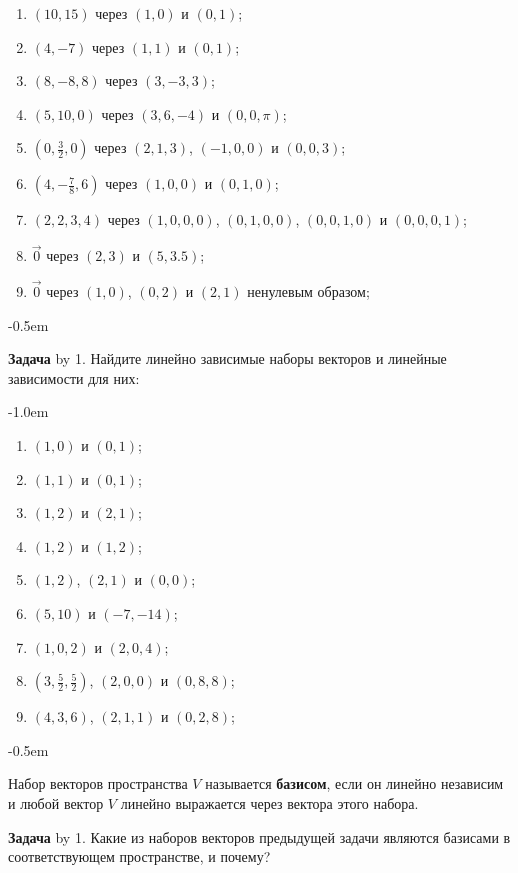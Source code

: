 \documentclass[a4paper,10pt]{article}
\def\problem{\textbf{Задача \the\problemnum}\advance\problemnum by 1}
\begin{document}
\begin{multicols}{3}
	\begin{enumerate}[label=(\arabic*)\,]
		\item $(10,15)$ через $(1,0)$ и $(0,1)$;
		\item $(4,-7)$ через $(1,1)$ и $(0,1)$;
		\item $(8,-8,8)$ через $(3,-3,3)$;
		\item $(5,10,0)$ через $(3,6,-4)$ и $(0,0,\pi)$;
		\item $(0,\frac32,0)$ через $(2,1,3)$, $(-1,0,0)$ и $(0,0,3)$;
		\item $(4,-\frac78,6)$ через $(1,0,0)$ и $(0,1,0)$;
		\item $(2,2,3,4)$ через $(1,0,0,0)$, $(0,1,0,0)$, $(0,0,1,0)$ и $(0,0,0,1)$;
		\item $\vec0$ через $(2,3)$ и $(5,3.5)$;
		\item $\vec0$ через $(1,0)$, $(0,2)$ и $(2,1)$ ненулевым образом;
	\end{enumerate}
\end{multicols}\par\kern-0.5em

\problem. Найдите линейно зависимые наборы векторов и линейные зависимости для них: \par\kern-1.0em

\begin{multicols}{3}
	\begin{enumerate}[label=(\arabic*)\,]
		\item $(1,0)$ и $(0,1)$;
		\item $(1,1)$ и $(0,1)$;
		\item $(1,2)$ и $(2,1)$;
		\item $(1,2)$ и $(1,2)$;
		\item $(1,2)$, $(2,1)$ и $(0,0)$;
		\item $(5,10)$ и $(-7,-14)$;
		\item $(1,0,2)$ и $(2,0,4)$;
		\item $(3,\frac52,\frac52)$, $(2,0,0)$ и $(0,8,8)$;
		\item $(4,3,6)$, $(2,1,1)$ и $(0,2,8)$;
	\end{enumerate}
\end{multicols}\par\kern-0.5em

Набор векторов пространства $V$ называется \textbf{базисом}, если он линейно независим и любой вектор $V$ линейно выражается через вектора этого набора.

\problem. Какие из наборов векторов предыдущей задачи являются базисами в соответствующем пространстве, и почему?
\end{document}
